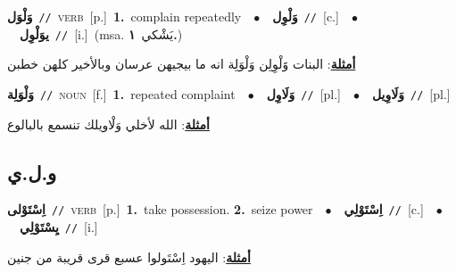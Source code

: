 \documentclass[10pt,a4paper,twoside]{article} %
\begin{document}
\begin{multicols}{2}
{\setlength\topsep{0pt}\textbf{\foreignlanguage{arabic}{وَلْوَل}}\ {\color{gray}\texttt{//}\color{black}}\ \textsc{verb}\ [p.]\ \textbf{1.}~complain repeatedly\ \ $\bullet$\ \ \setlength\topsep{0pt}\textbf{\foreignlanguage{arabic}{وَلْوِل}}\ {\color{gray}\texttt{//}\color{black}}\ [c.]\ \ $\bullet$\ \ \setlength\topsep{0pt}\textbf{\foreignlanguage{arabic}{يوَلْوِل}}\ {\color{gray}\texttt{//}\color{black}}\ [i.]\ \color{gray}(msa. \foreignlanguage{arabic}{يَشْكي}~\foreignlanguage{arabic}{\textbf{١.}})\color{black}\  \begin{flushright}\color{gray}\foreignlanguage{arabic}{\textbf{\underline{\foreignlanguage{arabic}{أمثلة}}}: البنات وََلْوِلِن وَلْوَلِة انه ما بيجيهن عرسان وبالأخير كلهن خطبن}\end{flushright}\color{black}} \vspace{2mm}

{\setlength\topsep{0pt}\textbf{\foreignlanguage{arabic}{وَلْوَلِة}}\ {\color{gray}\texttt{//}\color{black}}\ \textsc{noun}\ [f.]\ \textbf{1.}~repeated complaint\ \ $\bullet$\ \ \setlength\topsep{0pt}\textbf{\foreignlanguage{arabic}{وَلَاوِل}}\ {\color{gray}\texttt{//}\color{black}}\ [pl.]\ \ $\bullet$\ \ \setlength\topsep{0pt}\textbf{\foreignlanguage{arabic}{وَلَاوِيل}}\ {\color{gray}\texttt{//}\color{black}}\ [pl.]\  \begin{flushright}\color{gray}\foreignlanguage{arabic}{\textbf{\underline{\foreignlanguage{arabic}{أمثلة}}}: الله لأخلي وَلْاويلك تنسمع بالبالوع}\end{flushright}\color{black}} \vspace{2mm}

\vspace{-3mm}
\subsection*{\color{blue}\foreignlanguage{arabic}{و.ل.ي}\color{blue}{}} 

{\setlength\topsep{0pt}\textbf{\foreignlanguage{arabic}{اِسْتَوْلى}}\ {\color{gray}\texttt{//}\color{black}}\ \textsc{verb}\ [p.]\ \textbf{1.}~take possession.  \textbf{2.}~seize power\ \ $\bullet$\ \ \setlength\topsep{0pt}\textbf{\foreignlanguage{arabic}{اِسْتَوْلِي}}\ {\color{gray}\texttt{//}\color{black}}\ [c.]\ \ $\bullet$\ \ \setlength\topsep{0pt}\textbf{\foreignlanguage{arabic}{يِسْتَوْلِي}}\ {\color{gray}\texttt{//}\color{black}}\ [i.]\  \begin{flushright}\color{gray}\foreignlanguage{arabic}{\textbf{\underline{\foreignlanguage{arabic}{أمثلة}}}: اليهود اِسْتَولوا عسبع قرى قريبة من جنين}\end{flushright}\color{black}} \vspace{2mm}


\end{multicols}
\end{document}
